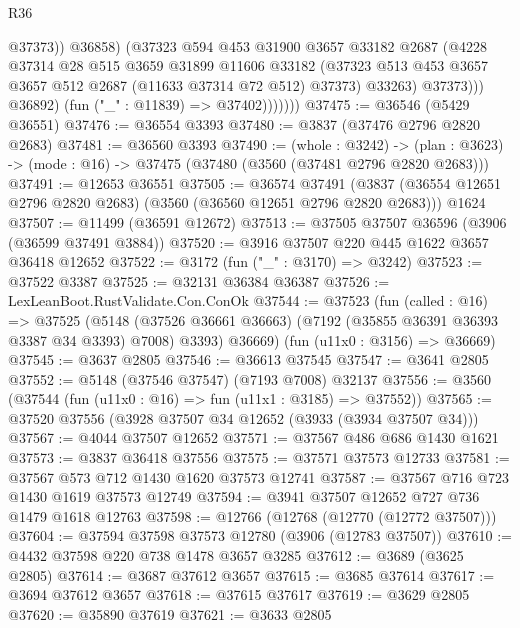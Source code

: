\begin{lexlean}{R36}
\begin{coremodule}
                            @37373))
                        @36858)
                      (@37323
                        @594
                        @453
                        @31900
                        @3657
                        @33182
                        @2687
                        (@4228
                          @37314
                          @28
                          @515
                          @3659
                          @31899
                          @11606
                          @33182
                          (@37323 @513 @453 @3657 @3657 @512 @2687 (@11633 @37314 @72 @512) @37373)
                          @33263)
                        @37373)))
                  @36892)
                (fun ("_" : @11839) => @37402)))))))
@37475 := @36546 (@5429 @36551)
@37476 := @36554 @3393
@37480 := @3837 (@37476 @2796 @2820 @2683)
@37481 := @36560 @3393
@37490 := (whole : @3242) ->
  (plan : @3623) -> (mode : @16) -> @37475 (@37480 (@3560 (@37481 @2796 @2820 @2683)))
@37491 := @12653 @36551
@37505 := @36574
    @37491
    (@3837 (@36554 @12651 @2796 @2820 @2683) (@3560 (@36560 @12651 @2796 @2820 @2683)))
    @1624
@37507 := @11499 (@36591 @12672)
@37513 := @37505 @37507 @36596 (@3906 (@36599 @37491 @3884))
@37520 := @3916 @37507 @220 @445 @1622 @3657 @36418 @12652
@37522 := @3172 (fun ("_" : @3170) => @3242)
@37523 := @37522 @3387
@37525 := @32131 @36384 @36387
@37526 := LexLeanBoot.RustValidate.Con.ConOk
@37544 := @37523
    (fun (called : @16) =>
    @37525
      (@5148 (@37526 @36661 @36663) (@7192 (@35855 @36391 @36393 @3387 @34 @3393) @7008) @3393)
      @36669)
    (fun (u11x0 : @3156) => @36669)
@37545 := @3637 @2805
@37546 := @36613 @37545
@37547 := @3641 @2805
@37552 := @5148 (@37546 @37547) (@7193 @7008) @32137
@37556 := @3560 (@37544 (fun (u11x0 : @16) => fun (u11x1 : @3185) => @37552))
@37565 := @37520 @37556 (@3928 @37507 @34 @12652 (@3933 (@3934 @37507 @34)))
@37567 := @4044 @37507 @12652
@37571 := @37567 @486 @686 @1430 @1621
@37573 := @3837 @36418 @37556
@37575 := @37571 @37573 @12733
@37581 := @37567 @573 @712 @1430 @1620 @37573 @12741
@37587 := @37567 @716 @723 @1430 @1619 @37573 @12749
@37594 := @3941 @37507 @12652 @727 @736 @1479 @1618 @12763
@37598 := @12766 (@12768 (@12770 (@12772 @37507)))
@37604 := @37594 @37598 @37573 @12780 (@3906 (@12783 @37507))
@37610 := @4432 @37598 @220 @738 @1478 @3657 @3285
@37612 := @3689 (@3625 @2805)
@37614 := @3687 @37612 @3657
@37615 := @3685 @37614
@37617 := @3694 @37612 @3657
@37618 := @37615 @37617
@37619 := @3629 @2805
@37620 := @35890 @37619
@37621 := @3633 @2805

\end{coremodule}
\end{lexlean}
